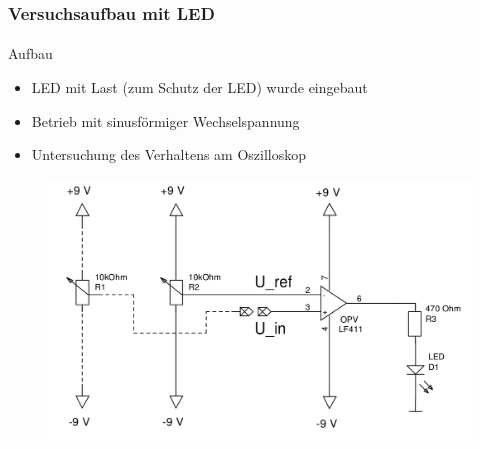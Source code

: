 \begin{frame}
\frametitle{Versuchsaufbau mit LED}
\framesubtitle{}
    \begin{block}{Aufbau}
         \begin{itemize}
             \item LED mit Last (zum Schutz der LED) wurde eingebaut
             \item Betrieb mit sinusförmiger Wechselspannung
             \item Untersuchung des Verhaltens am Oszilloskop
         \end{itemize}
    \end{block}
    \begin{figure}[H]
    \begin{center}
            \includegraphics[scale=0.2]{./img/schaltung/komparator_2.png}
    \end{center}
    \end{figure}
\end{frame}
